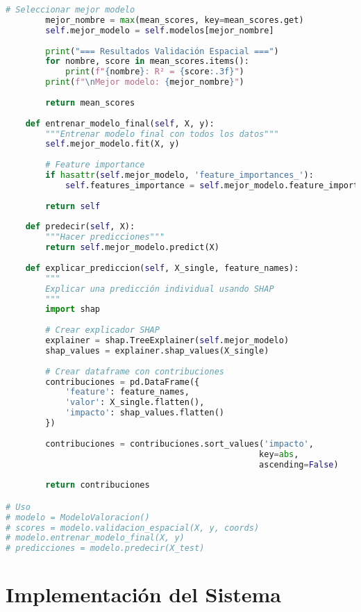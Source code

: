 \documentclass[11pt,a4paper]{article}
\begin{document}
\begin{lstlisting}[language=Python]
        # Seleccionar mejor modelo
        mejor_nombre = max(mean_scores, key=mean_scores.get)
        self.mejor_modelo = self.modelos[mejor_nombre]
        
        print("=== Resultados Validación Espacial ===")
        for nombre, score in mean_scores.items():
            print(f"{nombre}: R² = {score:.3f}")
        print(f"\nMejor modelo: {mejor_nombre}")
        
        return mean_scores
    
    def entrenar_modelo_final(self, X, y):
        """Entrenar modelo final con todos los datos"""
        self.mejor_modelo.fit(X, y)
        
        # Feature importance
        if hasattr(self.mejor_modelo, 'feature_importances_'):
            self.features_importance = self.mejor_modelo.feature_importances_
            
        return self
    
    def predecir(self, X):
        """Hacer predicciones"""
        return self.mejor_modelo.predict(X)
    
    def explicar_prediccion(self, X_single, feature_names):
        """
        Explicar una predicción individual usando SHAP
        """
        import shap
        
        # Crear explicador SHAP
        explainer = shap.TreeExplainer(self.mejor_modelo)
        shap_values = explainer.shap_values(X_single)
        
        # Crear dataframe con contribuciones
        contribuciones = pd.DataFrame({
            'feature': feature_names,
            'valor': X_single.flatten(),
            'impacto': shap_values.flatten()
        })
        
        contribuciones = contribuciones.sort_values('impacto', 
                                                   key=abs, 
                                                   ascending=False)
        
        return contribuciones

# Uso
# modelo = ModeloValoracion()
# scores = modelo.validacion_espacial(X, y, coords)
# modelo.entrenar_modelo_final(X, y)
# predicciones = modelo.predecir(X_test)
\end{lstlisting}

\newpage

\section{Implementación del Sistema}
\end{document}
